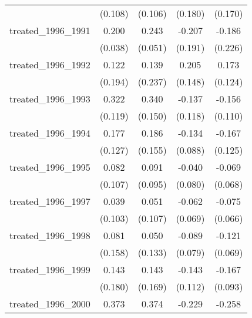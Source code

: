 {\begin{tabular}{l*{4}{c}}
            &     (0.108)         &     (0.106)         &     (0.180)         &     (0.170)         \\
[1em]
treated\_1996\_1991&       0.200\sym{***}&       0.243\sym{***}&      -0.207         &      -0.186         \\
            &     (0.038)         &     (0.051)         &     (0.191)         &     (0.226)         \\
[1em]
treated\_1996\_1992&       0.122         &       0.139         &       0.205         &       0.173         \\
            &     (0.194)         &     (0.237)         &     (0.148)         &     (0.124)         \\
[1em]
treated\_1996\_1993&       0.322\sym{**} &       0.340\sym{*}  &      -0.137         &      -0.156         \\
            &     (0.119)         &     (0.150)         &     (0.118)         &     (0.110)         \\
[1em]
treated\_1996\_1994&       0.177         &       0.186         &      -0.134         &      -0.167         \\
            &     (0.127)         &     (0.155)         &     (0.088)         &     (0.125)         \\
[1em]
treated\_1996\_1995&       0.082         &       0.091         &      -0.040         &      -0.069         \\
            &     (0.107)         &     (0.095)         &     (0.080)         &     (0.068)         \\
[1em]
treated\_1996\_1997&       0.039         &       0.051         &      -0.062         &      -0.075         \\
            &     (0.103)         &     (0.107)         &     (0.069)         &     (0.066)         \\
[1em]
treated\_1996\_1998&       0.081         &       0.050         &      -0.089         &      -0.121         \\
            &     (0.158)         &     (0.133)         &     (0.079)         &     (0.069)         \\
[1em]
treated\_1996\_1999&       0.143         &       0.143         &      -0.143         &      -0.167         \\
            &     (0.180)         &     (0.169)         &     (0.112)         &     (0.093)         \\
[1em]
treated\_1996\_2000&       0.373\sym{*}  &       0.374         &      -0.229         &      -0.258         \\

\end{tabular}}
